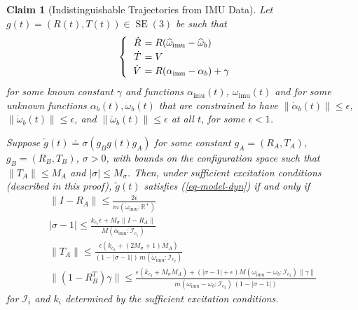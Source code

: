 \documentclass[]{article}
\def\w{\omega}
\def\hw{{\widehat\w}}
\newtheorem{claim}{Claim}
\def\gw{\tilde{g}}
\def\RR{\mathbb{R}}
\def\SE{\operatorname{SE}}
\def\imu{_\mathrm{imu}}
\def\m{{m}}
\def\M{{M}}
\def\I{\mathcal{I}}
\begin{document}
\begin{claim}[Indistinguishable Trajectories from IMU Data]\label{claim-five}
Let $g(t)= (R(t), T(t)) \in \SE(3)$ be such that
\begin{equation}
\begin{cases}
\begin{tabular}{>{$}r<{$} >{$\!\!\!\!\!}l<{$}}
\dot R &= R(\hw\imu  - \hw_b) \\
\dot T &= V \\
\dot V &= R(\alpha\imu  - \alpha_b) + \gamma
\end{tabular}
\end{cases}
\label{eq-model-dyn}
\end{equation}
for some known constant $\gamma$ and functions $\alpha\imu (t)$, $\w\imu (t)$ and for some unknown functions $\alpha_b(t), \w_b(t)$ that are constrained to have $\| \dot \alpha_b(t) \| \le \epsilon$, $\| \dot \w_b(t) \| \le \epsilon$, and $\|\ddot\w_b(t)\|\le\epsilon$ at all $t$,
for some $\epsilon<1$.

Suppose $\gw(t) \doteq \sigma(g_B g(t) g_A)$ for some  constant $g_A = (R_A, T_A)$, $g_B = (R_B, T_B)$, $\sigma > 0$,
with bounds on the configuration space such that
$\|T_A\|\leq M_A$ and $|\sigma|\leq M_\sigma$.
Then, under sufficient excitation conditions (described in this proof), 
$\gw(t)$ satisfies  (\ref{eq-model-dyn}) if and only if 
\begin{gather}
\| I - R_A \|  \leq  \frac{2{\epsilon}}{\m(\dot{\w}\imu\!:\!{\RR^+})}  \label{constraint1}\\
|\sigma - 1|  \le \frac{k_{c_1}\epsilon + M_\sigma\|I-R_A\|}{\M(\dot\alpha\imu\!:\!{\I_{c_1}})} \label{constraint2}\\
\|T_A\|\leq \frac{\epsilon(k_{c_2}+(2M_\sigma+1)M_A)}{(1-|\sigma-1|)\,\m(\ddot\w\imu\!:\!{\I_{c_2}})}\label{constraint3} \\
\|(1-R_B^T)\gamma\|\leq\frac{\epsilon(k_{c_3} + M_\sigma M_A) + (|\sigma-1|+\epsilon)\M(\w\imu-\w_b\!:\!\I_{c_3})\|\gamma\|}
{\m(\w\imu-\w_b\!:\!\I_{c_3})\,(1-|\sigma-1|)}\label{constraint4}
\end{gather}
for $\I_i$ and $k_i$ determined by the sufficient excitation conditions.
\end{claim}
\end{document}
